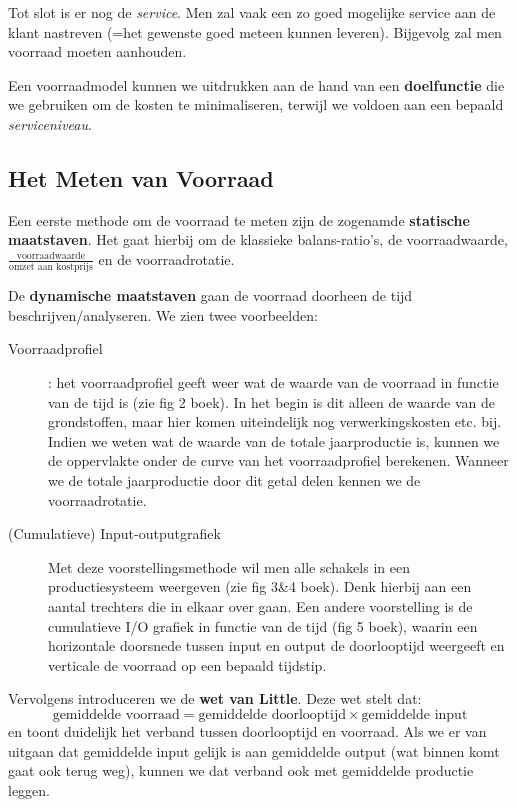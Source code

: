 Tot slot is er nog de \textit{service}. Men zal vaak een zo goed mogelijke service aan de klant nastreven (=het gewenste goed meteen kunnen leveren). Bijgevolg zal men voorraad moeten aanhouden.

Een voorraadmodel kunnen we uitdrukken aan de hand van een \textbf{doelfunctie} die we gebruiken om de kosten te minimaliseren, terwijl we voldoen aan een bepaald \textit{serviceniveau}.


\subsection{Het Meten van Voorraad}
Een eerste methode om de voorraad te meten zijn de zogenamde \textbf{statische maatstaven}. Het gaat hierbij om de klassieke balans-ratio's, de voorraadwaarde, $\frac{\text{voorraadwaarde}}{\text{omzet aan kostprijs}}$ en de voorraadrotatie.

De \textbf{dynamische maatstaven} gaan de voorraad doorheen de tijd beschrijven/analyseren. We zien twee voorbeelden:
\begin{description}
    \item[Voorraadprofiel]: het voorraadprofiel geeft weer wat de waarde van de voorraad in functie van de tijd is (zie fig 2 boek). In het begin is dit alleen de waarde van de grondstoffen, maar hier komen uiteindelijk nog verwerkingskosten etc. bij. Indien we weten wat de waarde van de totale jaarproductie is, kunnen we de oppervlakte onder de curve van het voorraadprofiel berekenen. Wanneer we de totale jaarproductie door dit getal delen kennen we de voorraadrotatie.

    \item[(Cumulatieve) Input-outputgrafiek] Met deze voorstellingsmethode wil men alle schakels in een productiesysteem weergeven (zie fig 3\&4 boek). Denk hierbij aan een aantal trechters die in elkaar over gaan. Een andere voorstelling is de cumulatieve I/O grafiek in functie van de tijd (fig 5 boek), waarin een horizontale doorsnede tussen input en output de doorlooptijd weergeeft en verticale de voorraad op een bepaald tijdstip.
\end{description}

Vervolgens introduceren we de \textbf{wet van Little}. Deze wet stelt dat:
\begin{equation}
    \boxed{\text{gemiddelde voorraad} = \text{gemiddelde doorlooptijd} \times \text{gemiddelde input}}
\end{equation}
en toont duidelijk het verband tussen doorlooptijd en voorraad. Als we er van uitgaan dat gemiddelde input gelijk is aan gemiddelde output (wat binnen komt gaat ook terug weg), kunnen we dat verband ook met gemiddelde productie leggen.
